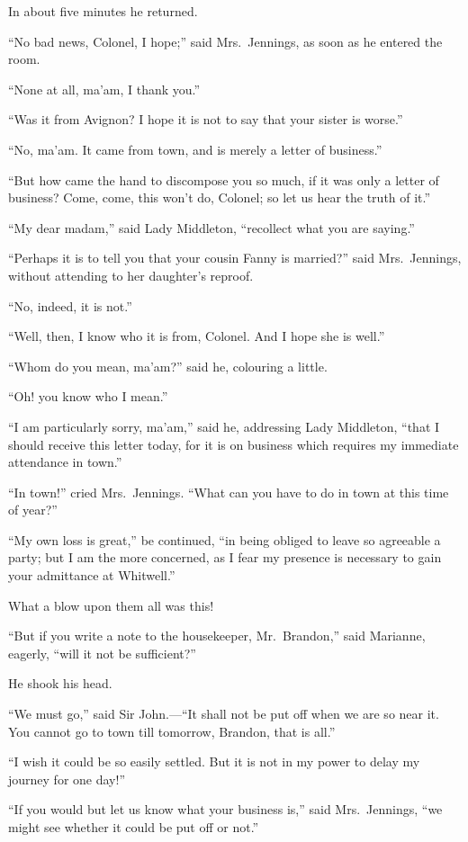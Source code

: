 In about five minutes he returned.

``No bad news, Colonel, I hope;'' said Mrs.\ Jennings,
as soon as he entered the room.

``None at all, ma'am, I thank you.''

``Was it from Avignon?  I hope it is not to say
that your sister is worse.''

``No, ma'am. It came from town, and is merely
a letter of business.''

``But how came the hand to discompose you so much,
if it was only a letter of business?  Come, come,
this won't do, Colonel; so let us hear the truth of it.''

``My dear madam,'' said Lady Middleton, ``recollect what
you are saying.''

``Perhaps it is to tell you that your cousin Fanny
is married?'' said Mrs.\ Jennings, without attending
to her daughter's reproof.

``No, indeed, it is not.''

``Well, then, I know who it is from, Colonel.  And I
hope she is well.''

``Whom do you mean, ma'am?'' said he, colouring a little.

``Oh! you know who I mean.''

``I am particularly sorry, ma'am,'' said he,
addressing Lady Middleton, ``that I should receive this
letter today, for it is on business which requires
my immediate attendance in town.''

``In town!'' cried Mrs.\ Jennings.  ``What can you
have to do in town at this time of year?''

``My own loss is great,'' be continued, ``in being obliged
to leave so agreeable a party; but I am the more concerned,
as I fear my presence is necessary to gain your admittance
at Whitwell.''

What a blow upon them all was this!

``But if you write a note to the housekeeper, Mr.\ Brandon,''
said Marianne, eagerly, ``will it not be sufficient?''

He shook his head.

``We must go,'' said Sir John.---``It shall not be put
off when we are so near it.  You cannot go to town till
tomorrow, Brandon, that is all.''

``I wish it could be so easily settled.  But it
is not in my power to delay my journey for one day!''

``If you would but let us know what your business is,''
said Mrs.\ Jennings, ``we might see whether it could be put
off or not.''

